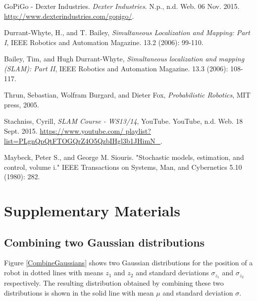 \documentclass[conference]{IEEEtran}
\begin{document}

%
%
%
\begin{thebibliography}{1}

GoPiGo - Dexter Industries. \emph{Dexter Industries}. N.p., n.d. Web. 06 Nov. 2015. \url{http://www.dexterindustries.com/gopigo/}.

Durrant-Whyte, H., and T. Bailey, \emph{Simultaneous Localization and Mapping: Part I}, IEEE Robotics and Automation Magazine. 13.2 (2006): 99-110.

Bailey, Tim, and Hugh Durrant-Whyte, \emph{Simultaneous localization and mapping (SLAM): Part II}, IEEE Robotics and Automation Magazine. 13.3 (2006): 108-117.

Thrun, Sebastian, Wolfram Burgard, and Dieter Fox, \emph{Probabilistic Robotics}, MIT press, 2005.

Stachniss, Cyrill, \emph{SLAM Course - WS13/14}, YouTube. YouTube, n.d. Web. 18 Sept. 2015. \url{https://www.youtube.com/ playlist?list=PLgnQpQtFTOGQrZ4O5QzbIHgl3b1JHimN_}.

Maybeck, Peter S., and George M. Siouris. "Stochastic models, estimation, and control, volume i." IEEE Transactions on Systems, Man, and Cybernetics 5.10 (1980): 282.

\end{thebibliography}

\section{Supplementary Materials}
\subsection{Combining two Gaussian distributions}
\label{sssec:num1} 
Figure \ref{CombineGaussians} shows two Gaussian distributions for the position of a robot in dotted lines with means $z_1$ and $z_2$ and standard deviations $\sigma_{z_1}$ and $\sigma_{z_2}$ respectively. The resulting distribution obtained by combining these two distributions is shown in the solid line with mean $\mu$ and standard deviation $\sigma$.\\
\end{document}
